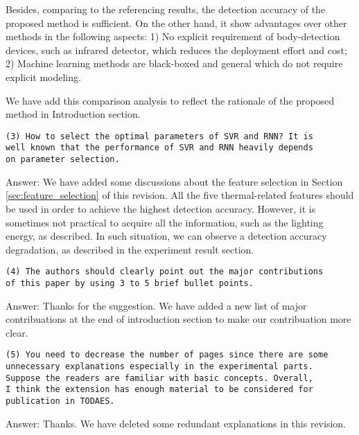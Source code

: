 Besides, comparing to the referencing results, the detection accuracy
of the proposed method is sufficient. On the other hand, it show
advantages over other methods in the following aspects: 1) No explicit requirement of
body-detection devices, such as infrared detector, which reduces the
deployment effort and cost; 2) Machine learning methods are
black-boxed and general which do not require explicit modeling.

We have add this comparison analysis to reflect the rationale of the
proposed method in Introduction section.

\begin{verbatim}
(3) How to select the optimal parameters of SVR and RNN? It is
well known that the performance of SVR and RNN heavily depends
on parameter selection.
\end{verbatim}

Answer: We have added some discussions about the feature selection in
Section \ref{sec:feature_selection} of this revision. All the five thermal-related
features should be used in order to achieve the highest detection accuracy.
However, it is sometimes not practical to acquire all the information,
such as the lighting energy, as described. In such situation, we can
observe a detection accuracy degradation, as described
in the experiment result section.




\begin{verbatim}
(4) The authors should clearly point out the major contributions
of this paper by using 3 to 5 brief bullet points.
\end{verbatim}

Answer: Thanks for the suggestion. We have added a new list of major
contribuations at the end of introduction section to make our
contribuation more clear.


\begin{verbatim}
(5) You need to decrease the number of pages since there are some
unnecessary explanations especially in the experimental parts.
Suppose the readers are familiar with basic concepts. Overall,
I think the extension has enough material to be considered for
publication in TODAES.
\end{verbatim}

Answer: Thanks. We have deleted some redundant explanations in this revision.
